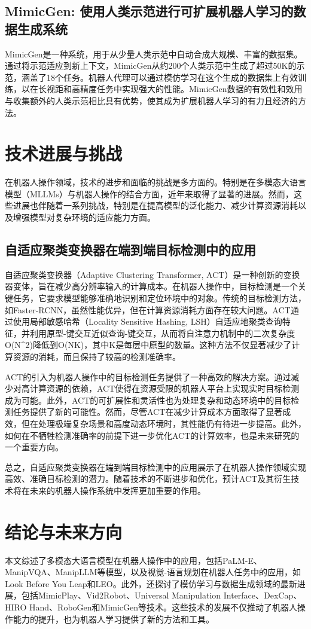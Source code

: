 \documentclass[a4paper]{article}
\begin{document}
\subsection{MimicGen: 使用人类示范进行可扩展机器人学习的数据生成系统}
MimicGen是一种系统，用于从少量人类示范中自动合成大规模、丰富的数据集。通过将示范适应到新上下文，MimicGen从约200个人类示范中生成了超过50K的示范，涵盖了18个任务。机器人代理可以通过模仿学习在这个生成的数据集上有效训练，以在长视距和高精度任务中实现强大的性能。MimicGen数据的有效性和效用与收集额外的人类示范相比具有优势，使其成为扩展机器人学习的有力且经济的方法。
\section{技术进展与挑战}
在机器人操作领域，技术的进步和面临的挑战是多方面的。特别是在多模态大语言模型（MLLMs）与机器人操作的结合方面，近年来取得了显著的进展。然而，这些进展也伴随着一系列挑战，特别是在提高模型的泛化能力、减少计算资源消耗以及增强模型对复杂环境的适应能力方面。

\subsection{自适应聚类变换器在端到端目标检测中的应用}
自适应聚类变换器（Adaptive Clustering Transformer, ACT）是一种创新的变换器变体，旨在减少高分辨率输入的计算成本。在机器人操作中，目标检测是一个关键任务，它要求模型能够准确地识别和定位环境中的对象。传统的目标检测方法，如Faster-RCNN，虽然性能优异，但在计算资源消耗方面存在较大问题。ACT通过使用局部敏感哈希（Locality Sensitive Hashing, LSH）自适应地聚类查询特征，并利用原型-键交互近似查询-键交互，从而将自注意力机制中的二次复杂度O(N^2)降低到O(NK)，其中K是每层中原型的数量。这种方法不仅显著减少了计算资源的消耗，而且保持了较高的检测准确率。

ACT的引入为机器人操作中的目标检测任务提供了一种高效的解决方案。通过减少对高计算资源的依赖，ACT使得在资源受限的机器人平台上实现实时目标检测成为可能。此外，ACT的可扩展性和灵活性也为处理复杂和动态环境中的目标检测任务提供了新的可能性。然而，尽管ACT在减少计算成本方面取得了显著成效，但在处理极端复杂场景和高度动态环境时，其性能仍有待进一步提高。此外，如何在不牺牲检测准确率的前提下进一步优化ACT的计算效率，也是未来研究的一个重要方向。

总之，自适应聚类变换器在端到端目标检测中的应用展示了在机器人操作领域实现高效、准确目标检测的潜力。随着技术的不断进步和优化，预计ACT及其衍生技术将在未来的机器人操作系统中发挥更加重要的作用。
\section{结论与未来方向}
本文综述了多模态大语言模型在机器人操作中的应用，包括PaLM-E、ManipVQA、ManipLLM等模型，以及视觉-语言规划在机器人任务中的应用，如Look Before You Leap和LEO。此外，还探讨了模仿学习与数据生成领域的最新进展，包括MimicPlay、Vid2Robot、Universal Manipulation Interface、DexCap、HIRO Hand、RoboGen和MimicGen等技术。这些技术的发展不仅推动了机器人操作能力的提升，也为机器人学习提供了新的方法和工具。
\end{document}
